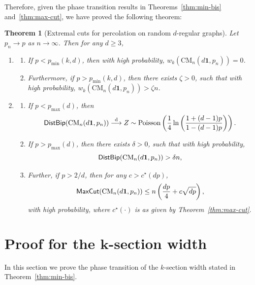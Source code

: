 \documentclass[11pt,a4paper, reqno]{article}
\numberwithin{equation}{section}
\numberwithin{equation}{section}
\newcommand{\1}{\ensuremath{\mathbbm{1}}}
\newcommand{\bld}[1]{\boldsymbol{#1}}
\newcommand{\Mcut}{{\sf{MaxCut}}}
\newcommand{\DB}{{\sf DistBip}}
\newtheorem{theorem}{Theorem}
\numberwithin{equation}{section}
\numberwithin{theorem}{section}
\begin{document}
Therefore, given the phase transition results in Theorems~\ref{thm:min-bis} and~\ref{thm:max-cut}, we have proved the following theorem:
\begin{theorem}[{Extremal cuts for percolation on random $d$-regular graphs}]
Let $p_n\to p$ as $n\to\infty$.
Then for any $d\geq 3$, 
\begin{enumerate}[{\normalfont (i)}]
\item 
\begin{enumerate}[{\normalfont (a)}]
\item If $p<p_{\min}(k,d)$, then with high probability, $w_k(\mathrm{CM}_n(d\bld{1},p_n))= 0$.
\item Furthermore, if $p>p_{\min}(k,d)$, then there exists $\zeta>0$, such that with high probability, $w_k(\mathrm{CM}_n(d\bld{1},p_n))>\zeta n$.
\end{enumerate}
\item 
\begin{enumerate}[{\normalfont (a)}]
\item If $p<p_{\max}(d)$, then 
  $$\DB(\mathrm{CM}_n(d\bld{1},p_n))\overset{\mathrm{d}}{\longrightarrow} Z\sim\mathrm{Poisson}\left(\frac{1}{4}\ln\left(\frac{1+(d-1)p}{1-(d-1)p}\right)\right).$$
\item If $p>p_{\max}(d)$, then there exists $\delta>0$, such that with high probability,
 $$\DB(\mathrm{CM}_n(d\bld{1},p_n))>\delta n,$$
\item Further, if $p>2/d$, then for any $c> c^{\star}(d p)$, 
  $$\Mcut(\mathrm{CM}_n(d\bld{1},p_n)) \leq n\left(\frac{d p}{4} + c \sqrt{d p}\right),$$
 with high probability, where $c^{\star}(\cdot)$ is as given by Theorem~\ref{thm:max-cut}. 
\end{enumerate}
\end{enumerate}
\end{theorem}




\section{{Proof for the \texorpdfstring{$\bld{k}$}{k}-section width}}
\label{sec:proof_minbisection}
In this section we prove the phase transition of the $k$-section width stated in Theorem~\ref{thm:min-bis}. 
\end{document}
